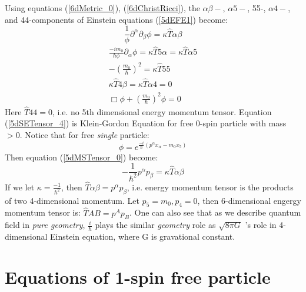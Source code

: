 \documentclass[twocolumn,showpacs,preprintnumbers,amsmath,amssymb]{revtex4}
\begin{document}
Using equations (\ref{6dMetric_0}), (\ref{6dChristRicci}), the $\alpha \beta-$, $\alpha 5- $, 55-, $\alpha 4- $, 
and 44-components of Einstein equations (\ref{5dEFE1}) become:
\begin{equation}
 \frac{1}{\phi}\partial^{\alpha}\partial_{\beta}\phi = \kappa \hat{T}{\alpha\beta} 
\label{5dMSTensor_0}
\end{equation}
\begin{eqnarray}
\frac{-im_0}{\hbar \phi} \partial_{\alpha} \phi = \kappa \hat{T}{5\alpha} = \kappa \hat{T}{\alpha 5} \\
\label{5dMSTensor_1}
-(\frac{m_0}{\hbar})^2 = \kappa \hat{T}{55}     \\
\label{5dMSTensor_2}
 \kappa \hat{T}{4 \beta} = \kappa \hat{T}{\alpha 4} = 0 \\
\label{5dSETensor_3}
\Box \phi + (\frac{m_0}{\hbar})^2\phi = 0  
\label{5dSETensor_4}
\end{eqnarray}
Here $\hat{T}{44} = 0$, i.e. no 5th dimensional energy momentum tensor. Equation (\ref{5dSETensor_4}) 
is Klein-Gordon Equation for free 0-spin particle with mass $>0$. Notice that for free {\it single} particle:
\begin{equation}
\phi = e^{\frac{-i}{\hbar}(p^\alpha x_{\alpha} - m_0 x_5)}
\label{plan_wave}
\end{equation}
Then equation (\ref{5dMSTensor_0}) become: 
\begin{equation}
 -\frac{1}{\hbar^2}p^{\alpha}p_{\beta} = \kappa \hat{T}{\alpha\beta}
\label{5dMSTensor_5}
\end{equation}
If we let $\kappa =\frac{-1}{\hbar^2} $, then $\hat{T}{\alpha\beta} = p^{\alpha}p_{\beta}$, i.e. energy momentum 
tensor is the products of two 4-dimensional momentum. Let $p_5 = m_0, p_4 = 0$, then 6-dimensional
engergy momentum tensor is: $\hat{T}{AB} = p^{A}p_{B}$.  One can also see that as we describe quantum field 
in {\it pure geometry}, $\frac{i}{\hbar}$ plays the similar {\it geometry} role as $\sqrt{8\pi G}$ 's 
role in 4-dimensional Einstein equation, where G is gravational constant. 

\section{Equations of 1-spin free particle} \label{OneSpin}
\end{document}

